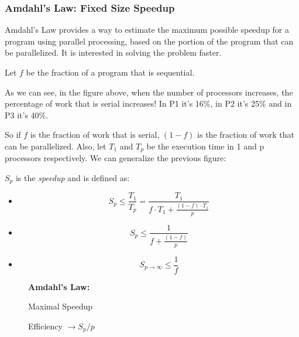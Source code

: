 \subsubsection{Amdahl's Law: Fixed Size Speedup}
Amdahl's Law provides a way to estimate the maximum possible speedup for a program using parallel processing, based on the portion of the program that can be parallelized. It is interested in solving the problem faster.
\par Let $f$ be the fraction of a program that is sequential.
%
\clearpage
%
\par As we can see, in the figure above, when the number of processors increases, the percentage of work that is serial increases! In P1 it's 16\%, in P2 it's 25\% and in P3 it's 40\%.
\par So if $f$ is the fraction of work that is serial, $(1-f)$ is the fraction of work that can be parallelized. Also, let $T_1$ and $T_p$ be the execution time in 1 and p processors respectively. We can generalize the previous figure:
\par $S_p$ is the \textit{speedup} and is defined as:
\begin{itemize}
    \item \[
    S_p \leq \frac{T_1}{T_p} = \frac{T_1}{f\cdot T_1+\frac{(1-f)\cdot T_1}{p}}
    \]
    \item \[S_p \leq \frac{1}{f + \frac{(1-f)}{p}}\]
    \item \[S_{p\rightarrow \infty} \leq \frac{1}{f}\]
\end{itemize}
%
\clearpage
%
\begin{figure}[h]
    \centering
    \par \textbf{Amdahl's Law:}\\
    \begin{minipage}{0.4\textwidth}
        \par Maximal Speedup\\
    \end{minipage}
    \hfill \vrule \hfill
    \begin{minipage}{0.4\textwidth}
        \par Efficiency $\rightarrow S_p/p$\\
    \end{minipage}
    \caption{}
    \label{fig:amdahl5}
\end{figure}
